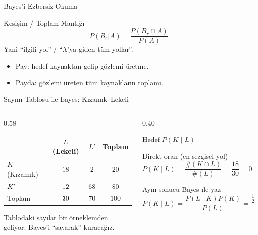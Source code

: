 \documentclass[light]{lutbeamer}
\begin{document}
\begin{frame}{Bayes'i Ezbersiz Okuma}
    \begin{block}{Kesişim / Toplam Mantığı}
        \[
        P(B_r|A)=\frac{P(B_r\cap A)}{P(A)}
        \]
        Yani ``ilgili yol'' / ``A'ya giden tüm yollar''.
    \end{block}

    \begin{itemize}
        \item Pay: hedef kaynaktan gelip gözlemi üretme.
        \item Payda: gözlemi üreten tüm kaynakların toplamı.
    \end{itemize}
\end{frame}

\begin{frame}{Sayım Tablosu ile Bayes: Kızamık--Lekeli}
    \small
    \begin{columns}[T]
        \begin{column}{0.58\textwidth}
            \centering
            \begin{tabular}{lcc|c}
                \toprule
                 & $L$ (Lekeli) & $L'$ & Toplam \\
                \midrule
                $K$ (Kızamık)   & $18$ & $2$  & $20$ \\
                $K'$            & $12$ & $68$ & $80$ \\
                \midrule
                Toplam          & $30$ & $70$ & $100$ \\
                \bottomrule
            \end{tabular}

            \vspace{0.2cm}
            \footnotesize
            Tablodaki sayılar bir örneklemden geliyor: Bayes'i ``sayarak'' kuracağız.
        \end{column}

        \begin{column}{0.40\textwidth}
            \begin{block}{Hedef}
                $P(K\mid L)$
            \end{block}

            \begin{alertblock}{Direkt oran (en sezgisel yol)}
                \[
                P(K\mid L)=\frac{\#(K\cap L)}{\#(L)}=\frac{18}{30}=0.6
                \]
            \end{alertblock}

            \begin{block}{Aynı sonucu Bayes ile yaz}
                \[
                P(K\mid L)=\frac{P(L\mid K)P(K)}{P(L)}
                =\frac{\tfrac{18}{20}\cdot\tfrac{20}{100}}{\tfrac{30}{100}}
                =\frac{0.9\times 0.2}{0.3}=0.6\;\checkmark
                \]
            \end{block}
        \end{column}
    \end{columns}
\end{frame}
\end{document}
